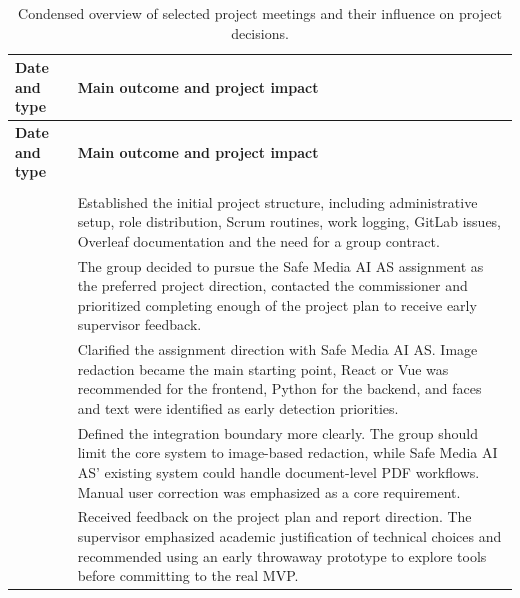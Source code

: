 \begin{xltabular}{\textwidth}{
    >{\raggedright\arraybackslash}p{2.7cm}
    >{\raggedright\arraybackslash}X
}
\caption{Condensed overview of selected project meetings and their influence on project decisions.}
\label{tab:meeting-impact}\\

\toprule
\textbf{Date and type} & \textbf{Main outcome and project impact} \\
\midrule
\endfirsthead

\toprule
\textbf{Date and type} & \textbf{Main outcome and project impact} \\
\midrule
\endhead

\midrule
{} \\
\endfoot

\bottomrule
\endlastfoot

& Established the initial project structure, including administrative setup, role distribution, Scrum routines, work logging, GitLab issues, Overleaf documentation and the need for a group contract. \\

& The group decided to pursue the Safe Media AI AS assignment as the preferred project direction, contacted the commissioner and prioritized completing enough of the project plan to receive early supervisor feedback. \\

& Clarified the assignment direction with Safe Media AI AS. Image redaction became the main starting point, React or Vue was recommended for the frontend, Python for the backend, and faces and text were identified as early detection priorities. \\

& Defined the integration boundary more clearly. The group should limit the core system to image-based redaction, while Safe Media AI AS' existing system could handle document-level PDF workflows. Manual user correction was emphasized as a core requirement. \\

& Received feedback on the project plan and report direction. The supervisor emphasized academic justification of technical choices and recommended using an early throwaway prototype to explore tools before committing to the real MVP. \\


\end{xltabular}
